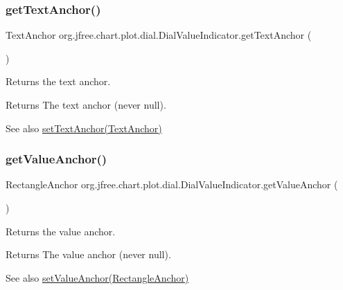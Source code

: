 \subsubsection{\texorpdfstring{get\+Text\+Anchor()}{getTextAnchor()}}
{\footnotesize\ttfamily Text\+Anchor org.\+jfree.\+chart.\+plot.\+dial.\+Dial\+Value\+Indicator.\+get\+Text\+Anchor (\begin{DoxyParamCaption}{ }\end{DoxyParamCaption})}

Returns the text anchor.

\begin{DoxyReturn}{Returns}
The text anchor (never {\ttfamily null}).
\end{DoxyReturn}
\begin{DoxySeeAlso}{See also}
\mbox{\hyperlink{classorg_1_1jfree_1_1chart_1_1plot_1_1dial_1_1_dial_value_indicator_a11234b9c4cad620ba9edee6123e21611}{set\+Text\+Anchor(\+Text\+Anchor)}} 
\end{DoxySeeAlso}
\mbox{\label{classorg_1_1jfree_1_1chart_1_1plot_1_1dial_1_1_dial_value_indicator_aaacc1d16a645b205f6144deed000fb48}} 
\subsubsection{\texorpdfstring{get\+Value\+Anchor()}{getValueAnchor()}}
{\footnotesize\ttfamily Rectangle\+Anchor org.\+jfree.\+chart.\+plot.\+dial.\+Dial\+Value\+Indicator.\+get\+Value\+Anchor (\begin{DoxyParamCaption}{ }\end{DoxyParamCaption})}

Returns the value anchor.

\begin{DoxyReturn}{Returns}
The value anchor (never {\ttfamily null}).
\end{DoxyReturn}
\begin{DoxySeeAlso}{See also}
\mbox{\hyperlink{classorg_1_1jfree_1_1chart_1_1plot_1_1dial_1_1_dial_value_indicator_a373a9fc36d9bdf03d176e02d3a7101b6}{set\+Value\+Anchor(\+Rectangle\+Anchor)}} 
\end{DoxySeeAlso}
\mbox{\label{classorg_1_1jfree_1_1chart_1_1plot_1_1dial_1_1_dial_value_indicator_ac8bea0c81662643ffa86cf77eb39d318}} 
